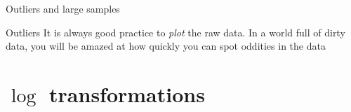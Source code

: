 \documentclass[aspectratio=169,t,11pt,table]{beamer}
\begin{document}

\begin{frame}{Outliers and large samples}
\end{frame}

\begin{frame}{Outliers}
  It is always good practice to \emph{plot} the raw data. In a world full of dirty data, you will be amazed at how quickly you can spot oddities in the data
\end{frame}


\section{\texorpdfstring{$\log$}{log} transformations}

\end{document}
